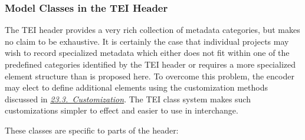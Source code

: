 \subsubsection[{Model Classes in the TEI Header}]{Model Classes in the TEI Header}\par
The TEI header provides a very rich collection of metadata categories, but makes no claim to be exhaustive. It is certainly the case that individual projects may wish to record specialized metadata which either does not fit within one of the predefined categories identified by the TEI header or requires a more specialized element structure than is proposed here. To overcome this problem, the encoder may elect to define additional elements using the customization methods discussed in \textit{\hyperref[MD]{23.3.\ Customization}}. The TEI class system makes such customizations simpler to effect and easier to use in interchange.\par
These classes are specific to parts of the header: 
